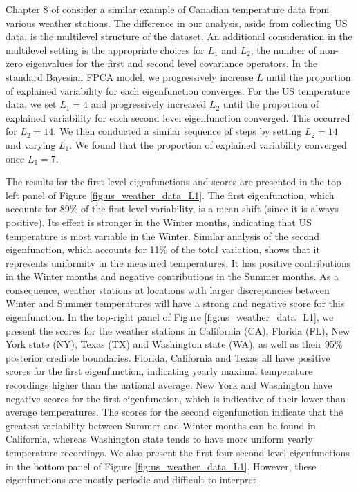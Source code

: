 \documentclass[ba]{imsart}
\numberwithin{equation}{section}
\theoremstyle{plain}
\begin{document}
Chapter 8 of \citet{ramsay05} consider a similar example of Canadian temperature data from various weather
stations. The difference in our analysis, aside from collecting US data, is the multilevel structure of the
dataset. An additional consideration in the multilevel setting is the appropriate choices for $L_1$ and $L_2$,
the number of non-zero eigenvalues for the first and second level covariance operators.
In the standard Bayesian FPCA model, we progressively increase $L$ until the proportion of 
explained variability for each eigenfunction converges. For the US temperature data, we set
$L_1 = 4$ and progressively increased $L_2$ until the proportion of 
explained variability for each second level eigenfunction converged. This occurred for $L_2 = 14$.
We then conducted a similar sequence of steps by setting $L_2 = 14$ and varying $L_1$. We
found that the proportion of explained variability converged once $L_1 = 7$.

The results for the first level eigenfunctions and scores are presented in
the top-left panel of Figure \ref{fig:us_weather_data_L1}.
The first eigenfunction, which accounts for 89\% of the first level variability, is a mean shift (since it is always
positive). Its effect is stronger in the Winter months, indicating that US temperature is most variable in the
Winter. Similar analysis of the
second eigenfunction, which accounts for 11\% of the total variation, shows that it represents uniformity in the measured
temperatures. It has positive contributions in the Winter months and negative contributions in the Summer months.
As a consequence, weather stations at locations with larger discrepancies
between Winter and Summer temperatures will have a strong and negative score for this eigenfunction.
In the top-right panel of Figure \ref{fig:us_weather_data_L1}, we present the scores for the weather stations in
California (CA), Florida (FL), New York state (NY), Texas (TX) and Washington state (WA), as well as their
95\% posterior credible boundaries. Florida, California and Texas all have positive scores for the first
eigenfunction, indicating yearly maximal temperature recordings higher than the national average. New York
and Washington have negative scores for the first eigenfunction, which is indicative of their lower than average
temperatures.
The scores for the second eigenfunction indicate that the
greatest variability between Summer and Winter months can be found
in California, whereas Washington state tends to have more uniform yearly
temperature recordings.
We also present the first four second level eigenfunctions in the bottom panel of Figure \ref{fig:us_weather_data_L1}.
However, these eigenfunctions are mostly periodic and difficult to interpret.
\end{document}
